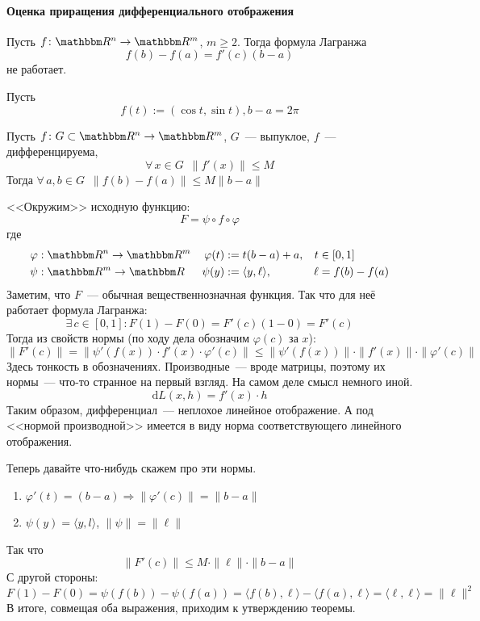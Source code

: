 \documentclass[12pt]{../../../notes}
\begin{document}
\paragraph{Оценка приращения дифференциального отображения}
\label{par:diffspace::diffestim}

\begin{prop}\label{prop:diffspace::diffestim::lagrfail}
  Пусть $f\colon \R^n \to \R^m$, $m \geqslant 2$. Тогда формула Лагранжа
  \[
    f(b) - f(a) = f'(c)(b - a)
  \]
  не работает.
\end{prop}
\begin{exmp*}\label{exmp:diffspace::diffestim::lagrfail}
  Пусть 
  \[
    f(t) := (\cos t, \sin t), b - a = 2\pi
  \]
\end{exmp*}

\begin{thrm}\label{thrm:diffspace::diffestim::diffestim}
  Пусть $f\colon G \subset \R^n \to \R^m$, $G$~--- выпуклое, $f$~--- дифференцируема, 
  \[ 
    \forall\, x \in G \;\: \| f'(x) \| \leqslant M 
  \]
  Тогда $\forall\, a,b \in G \;\: \|f(b) - f(a)\| \leqslant M \| b-a \|$
\end{thrm}
\begin{ittproof}
  <<Окружим>>  исходную функцию:
  \[
    F = \psi \circ f \circ \varphi
  \]
  где 
  \begin{align*}
    \varphi&: \R^n \to \R^m & \varphi(t) &:= t(b-a) + a, & t&\in [0,1] \\
    \psi&: \R^m \to \R & \psi(y) &:= \langle y, \ell \rangle, & \ell &= f(b)-f(a) 
  \end{align*}
  Заметим, что $F$~--- обычная вещественнозначная функция. Так что для неё работает формула
  Лагранжа:
  \[
    \exists\, c \in [0,1] \colon F(1)-F(0) = F'(c)(1-0) = F'(c)
  \]
  Тогда из свойств нормы (по ходу дела обозначим $\varphi(c)$ за $x$):
  \[
    \|F'(c)\| = \|\psi'(f(x)) \cdot f'(x) \cdot \varphi'(c)\| \leqslant 
    \|\psi'(f(x)) \| \cdot \| f'(x) \| \cdot \| \varphi'(c)\|
  \]
  Здесь тонкость в обозначениях. Производные~--- вроде матрицы, поэтому их нормы~--- что-то
  странное на первый взгляд. На самом деле смысл немного иной. 
  \[
    \mathrm d L(x, h) = f'(x) \cdot h
  \]
  Таким образом, дифференциал~--- неплохое линейное отображение. А под <<нормой производной>>
  имеется в виду норма соответствующего линейного отображения.

  Теперь давайте что-нибудь скажем про эти нормы. 
  \begin{enumerate}
    \item $\varphi'(t) = (b-a) \Rightarrow \| \varphi'(c) \| = \| b - a\|$
    \item $\psi(y) = \langle y, l \rangle$, $\| \psi\| = \|\ell\|$      
  \end{enumerate}
  Так что 
  \[
    \| F'(c)\| \leqslant M \cdot \| \ell \| \cdot \|b-a\|
  \]
  С другой стороны:
  \[
    F(1) - F(0) = \psi(f(b)) - \psi(f(a)) = \langle f(b), \ell \rangle - \langle f(a), \ell \rangle
    = \langle \ell, \ell \rangle  = \|\ell \|^2
  \]
  В итоге, совмещая оба выражения, приходим к утверждению теоремы.
\end{ittproof}
\end{document}
